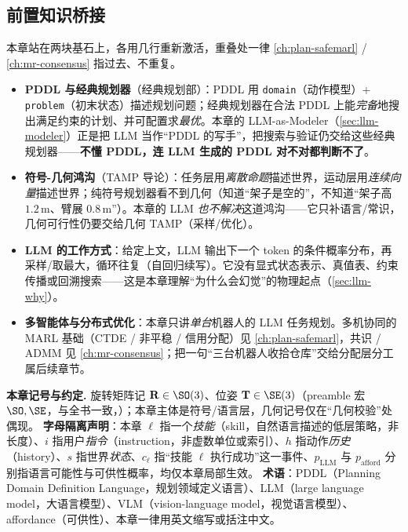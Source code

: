 \subsection*{前置知识桥接}
本章站在两块基石上，各用几行重新激活，重叠处一律 \cref{ch:plan-safemarl} / \cref{ch:mr-consensus} 指过去、不重复。

\begin{itemize}
  \item \textbf{PDDL 与经典规划器}（经典规划部）：PDDL 用 \texttt{domain}（动作模型）+ \texttt{problem}（初末状态）描述规划问题；经典规划器在合法 PDDL 上能\emph{完备}地搜出满足约束的计划、并可配置求\emph{最优}。本章的 LLM-as-Modeler（\cref{sec:llm-modeler}）正是把 LLM 当作“PDDL 的写手”，把搜索与验证仍交给这些经典规划器——\textbf{不懂 PDDL，连 LLM 生成的 PDDL 对不对都判断不了}。
  \item \textbf{符号-几何鸿沟}（TAMP 导论）：任务层用\emph{离散命题}描述世界，运动层用\emph{连续向量}描述世界；纯符号规划器看不到几何（知道“架子是空的”，不知道“架子高 $1.2\,$m、臂展 $0.8\,$m”）。本章的 LLM \emph{也不解决}这道鸿沟——它只补语言/常识，几何可行性仍要交给几何 TAMP（采样/优化）。
  \item \textbf{LLM 的工作方式}：给定上文，LLM 输出下一个 token 的条件概率分布，再采样/取最大，循环往复（自回归续写）。它没有显式状态表示、真值表、约束传播或回溯搜索——这是本章理解“为什么会幻觉”的物理起点（\cref{sec:llm-why}）。
  \item \textbf{多智能体与分布式优化}：本章只讲\emph{单台}机器人的 LLM 任务规划。多机协同的 MARL 基础（CTDE / 非平稳 / 信用分配）见 \cref{ch:plan-safemarl}，共识 / ADMM 见 \cref{ch:mr-consensus}；把一句“三台机器人收拾仓库”交给分配层分工属后续章节。
\end{itemize}

\begin{note}
\textbf{本章记号与约定.}\;
旋转矩阵记 $\mathbf{R}\in\SO(3)$、位姿 $\mathbf{T}\in\SE(3)$（preamble 宏 $\SO,\SE$，与全书一致，）；本章主体是符号/语言层，几何记号仅在“几何校验”处偶现。
\textbf{字母隔离声明}：本章 $\ell$ 指一个\emph{技能}（skill，自然语言描述的低层策略，非长度）、$i$ 指用户\emph{指令}（instruction，非虚数单位或索引）、$h$ 指动作\emph{历史}（history）、$s$ 指世界\emph{状态}、$c_\ell$ 指“技能 $\ell$ 执行成功”这一事件、$p_{\text{LLM}}$ 与 $p_{\text{afford}}$ 分别指语言可能性与可供性概率，均仅本章局部生效。
\textbf{术语}：PDDL（Planning Domain Definition Language，规划领域定义语言）、LLM（large language model，大语言模型）、VLM（vision-language model，视觉语言模型）、affordance（可供性）、本章一律用英文缩写或括注中文。
\end{note}

